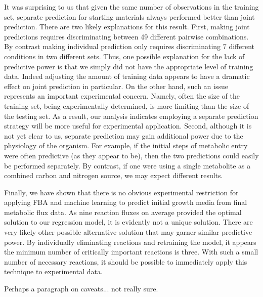 \documentclass[12pt]{article}
\begin{document}
It was surprising to us that given the same number of observations in the training set, separate prediction for starting materials always performed better than joint prediction. There are two likely explanations for this result. First, making joint predictions requires discriminating between 49 different pairwise combinations. By contrast making individual prediction only requires discriminating 7 different conditions in two different sets. Thus, one possible explanation for the lack of predictive power is that we simply did not have the appropriate level of training data. Indeed adjusting the amount of training data appears to have a dramatic effect on joint prediction in particular. On the other hand, such an issue represents an important experimental concern. Namely, often the size of the training set, being experimentally determined, is more limiting than the size of the testing set. As a result, our analysis indicates employing a separate prediction strategy will be more useful for experimental application. Second, although it is not yet clear to us, separate prediction may gain additional power due to the physiology of the organism. For example, if the initial steps of metabolic entry were often predictive (as they appear to be), then the two predictions could easily be performed separately. By contrast, if one were using a single metabolite as a combined carbon and nitrogen source, we may expect different results.

Finally, we have shown that there is no obvious experimental restriction for applying FBA and machine learning to predict initial growth media from final metabolic flux data. As nine reaction fluxes on average provided the optimal solution to our regression model, it is evidently not a unique solution. There are very likely other possible alternative solution that may garner similar predictive power. By individually eliminating reactions and retraining the model, it appears the minimum number of critically important reactions is three.  With such a small number of necessary reactions, it should be possible to immediately apply this technique to experimental data. 

Perhaps a paragraph on caveats... not really sure.
\end{document}
